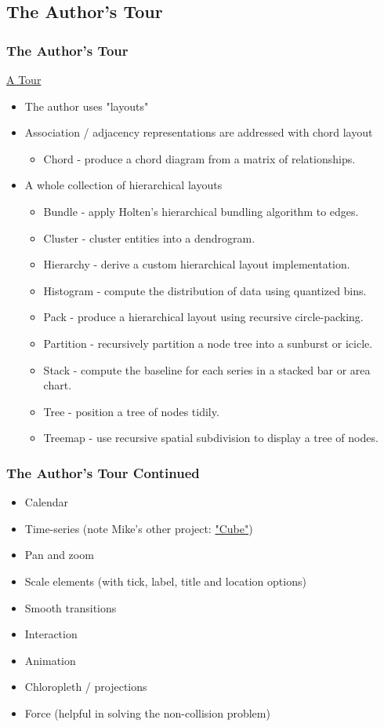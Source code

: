 \documentclass{beamer}
\begin{document}
\subsection{The Author's Tour}


\begin{frame}
\frametitle{The Author's Tour}
\href{http://mbostock.github.com/d3/talk/20111018/\#0}{A Tour}
\begin{itemize}
\item The author uses "layouts"
\item Association / adjacency representations are addressed with chord layout
    \begin{itemize}
    \item Chord - produce a chord diagram from a matrix of relationships.
    \end{itemize}
\item A whole collection of hierarchical layouts 
    \begin{itemize}
    \item Bundle - apply Holten's hierarchical bundling algorithm to edges.
    \item Cluster - cluster entities into a dendrogram.
    \item Hierarchy - derive a custom hierarchical layout implementation.
    \item Histogram - compute the distribution of data using quantized bins.
    \item Pack - produce a hierarchical layout using recursive circle-packing.
    \item Partition - recursively partition a node tree into a sunburst or icicle.
    \item Stack - compute the baseline for each series in a stacked bar or area chart.
    \item Tree - position a tree of nodes tidily.
    \item Treemap - use recursive spatial subdivision to display a tree of nodes.
    \end{itemize}
\end{itemize}
\end{frame}



\begin{frame}
\frametitle{The Author's Tour Continued}
\begin{itemize}
\item Calendar
\item Time-series (note Mike's other project: \href{https://github.com/square/cube}{"Cube"})
\item Pan and zoom 
\item Scale elements (with tick, label, title and location options)
\item Smooth transitions
\item Interaction 
\item Animation
\item Chloropleth / projections
\item Force (helpful in solving the non-collision problem)
\end{itemize}
\end{frame}
\end{document}
